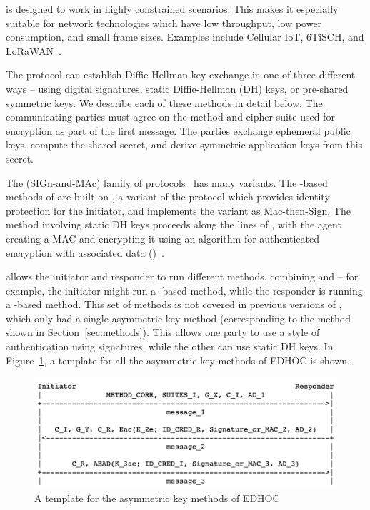 \mEdhoc is designed to work in highly constrained scenarios. This makes it especially suitable for network technologies which have low throughput, low power consumption, and small frame sizes. Examples include Cellular IoT, 6TiSCH, and LoRaWAN~\cite{lorawan1,lorawan2}.

The \mEdhoc protocol can establish Diffie-Hellman key exchange in one of three different ways -- using digital signatures, static Diffie-Hellman (DH) keys, or pre-shared symmetric keys. We describe each of these methods in detail below. The communicating parties must agree on the method and cipher suite used for encryption as part of the first message. The parties exchange ephemeral public keys, compute the shared secret, and derive symmetric application keys from this secret.

The \mSigma (SIGn-and-MAc) family of protocols~\cite{sigma} has many variants. The \mSig-based methods of \mEdhoc are built on \mSigmaI, a variant of the \mSigma protocol which provides identity protection for the initiator, and  implements the \mSigmaI variant as Mac-then-Sign. The method involving static DH keys proceeds along the lines of \mOptls, with the agent creating a MAC and encrypting it using an algorithm for authenticated encryption with associated data (\mAead)~\cite{aead,rfc5116}. 

\mEdhoc allows the initiator and responder to run different methods, combining \mSig and \mStat -- for example, the initiator might run a \mSig-based method, while the responder is running a \mStat-based method. This set of methods is not covered in previous versions of \mEdhoc, which only had a single \mSigma asymmetric key method (corresponding to the \mSigSig method shown in Section~\ref{sec:methods}). This allows one party to use a \mSigma style of authentication using signatures, while the other can use static DH keys. In Figure~\ref{fig:edhocasym}, a template for all the asymmetric key methods of EDHOC is shown. 

\begin{figure}[!h]\label{fig:edhocasym}
\centering
\includegraphics[scale=0.3]{Images/asym.png}
\caption{A template for the asymmetric key methods of EDHOC}
\end{figure}

